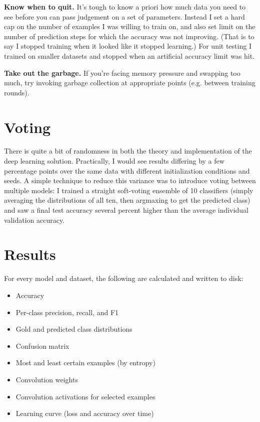 \documentclass{article}
\begin{document}
\textbf{Know when to quit.} It's tough to know a priori how much data you need to see before you can pass judgement on a set of parameters. Instead I set a hard cap on the number of examples I was willing to train on, and also set limit on the number of prediction steps for which the accuracy was not improving. (That is to say I stopped training when it looked like it stopped learning.) For unit testing I trained on smaller datasets and stopped when an artificial accuracy limit was hit.

\textbf{Take out the garbage.} If you're facing memory pressure and swapping too much, try invoking garbage collection at appropriate points (e.g. between training rounds).

\section{Voting}

There is quite a bit of randomness in both the theory and implementation of the deep learning solution.  Practically, I would see results differing by a few percentage points over the same data with different initialization conditions and seeds. A simple technique to reduce this variance was to introduce voting between multiple models: I trained a straight soft-voting ensemble of 10 classifiers (simply averaging the distributions of all ten, then argmaxing to get the predicted class) and saw a final test accuracy several percent higher than the average individual validation accuracy.

\section{Results}

For every model and dataset, the following are calculated and written to disk:

\begin{itemize}
  \item Accuracy
  \item Per-class precision, recall, and F1
  \item Gold and predicted class distributions
  \item Confusion matrix
  \item Most and least certain examples (by entropy)
  \item Convolution weights
  \item Convolution activations for selected examples
  \item Learning curve (loss and accuracy over time)
\end{itemize}
\end{document}

